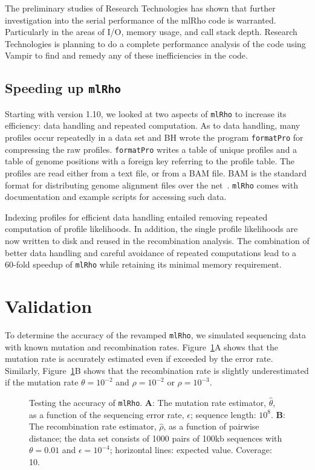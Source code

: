 \documentclass{sig-alternate}
\newcommand{\ty}{\texttt}
\begin{document}
The preliminary studies of Research Technologies has shown that further investigation into the serial
performance of the mlRho code is warranted. Particularly in the areas of I/O, memory usage, and call stack
depth. Research Technologies is planning to do a complete performance analysis of the code using Vampir to
find and remedy any of these inefficiencies in the code. 

\subsection{Speeding up \ty{mlRho}}
Starting with version 1.10, we looked at two aspects of \ty{mlRho} to
increase its efficiency: data handling and repeated
computation. As to data handling, many profiles occur repeatedly in a
data set and BH wrote the program \ty{formatPro} for compressing the raw
profiles. \ty{formatPro} writes a table of unique profiles and a table
of genome positions with a foreign key referring to the profile
table. The profiles are read either from a text file, or from a BAM
file. BAM is the standard format for distributing genome alignment
files over the net~\cite{li09:seq}. \ty{mlRho} comes with documentation and example
scripts for accessing such data.

Indexing profiles for efficient data handling entailed removing repeated
computation of profile likelihoods. In addition, the single profile
likelihoods are now written to disk and reused in the recombination
analysis. The combination of better data handling and careful
avoidance of repeated computations lead to a 60-fold speedup of
\ty{mlRho} while retaining its minimal memory requirement.

\section{Validation}
To determine the accuracy of the revamped \ty{mlRho}, we simulated
sequencing data with known mutation and recombination
rates. Figure~\ref{fig:test}A shows that the mutation rate is
accurately estimated even if exceeded by the error
rate. Similarly, Figure~\ref{fig:test}B shows that the recombination rate is
slightly underestimated if the mutation rate $\theta=10^{-2}$ and
$\rho=10^{-2}$ or $\rho=10^{-3}$.

\begin{figure}
  \begin{center}
  \end{center}
\caption{Testing the accuracy of \ty{mlRho}. \textbf{A}: The mutation
  rate estimator, $\hat\theta$, as a function of the sequencing error
  rate, $\epsilon$; sequence length: $10^8$. \textbf{B}: The
  recombination rate estimator, $\hat\rho$, as a function of pairwise
  distance; the data set consists of 1000 pairs of 100kb sequences
  with $\theta=0.01$ and $\epsilon=10^{-4}$; horizontal lines:
  expected value. Coverage: 10.}\label{fig:test}
\end{figure}
\end{document}
